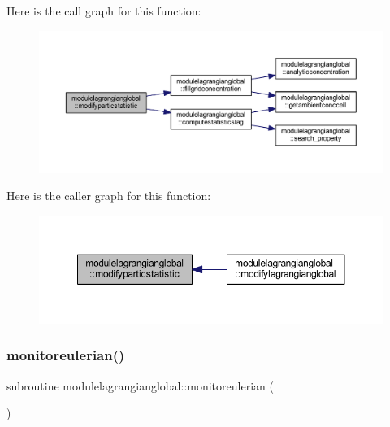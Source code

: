 Here is the call graph for this function\+:\nopagebreak
\begin{figure}[H]
\begin{center}
\leavevmode
\includegraphics[width=350pt]{namespacemodulelagrangianglobal_a3039668c6b76c0fdde5ffdc19ebdfe88_cgraph}
\end{center}
\end{figure}
Here is the caller graph for this function\+:\nopagebreak
\begin{figure}[H]
\begin{center}
\leavevmode
\includegraphics[width=350pt]{namespacemodulelagrangianglobal_a3039668c6b76c0fdde5ffdc19ebdfe88_icgraph}
\end{center}
\end{figure}
\mbox{\label{namespacemodulelagrangianglobal_a6480946d4669725ebee110f6be9fba5b}} 
\subsubsection{\texorpdfstring{monitoreulerian()}{monitoreulerian()}}
{\footnotesize\ttfamily subroutine modulelagrangianglobal\+::monitoreulerian (\begin{DoxyParamCaption}{ }\end{DoxyParamCaption})\hspace{0.3cm}{\ttfamily [private]}}

